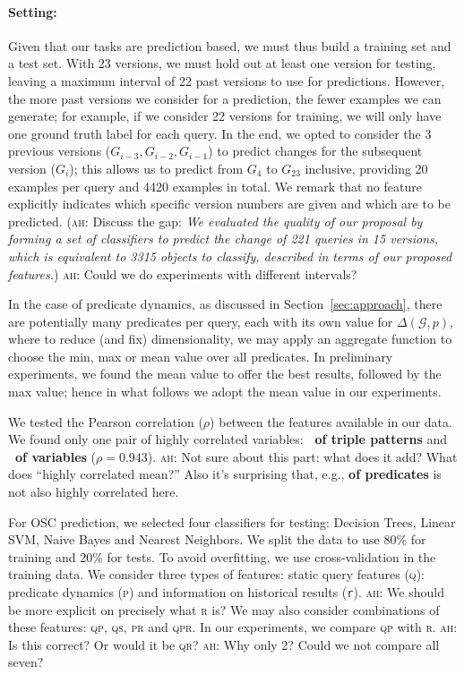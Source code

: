 \documentclass[runningheads]{llncs}
\newcommand{\ah}[1]{{\color{blue}\textsc{ah:} #1}}
\begin{document}
\paragraph{Setting:} Given that our tasks are prediction based, we must thus build a training set and a test set. With 23 versions, we must hold out at least one version for testing, leaving a maximum interval of 22 past versions to use for predictions. However, the more past versions we consider for a prediction, the fewer examples we can generate; for example, if we consider 22 versions for training, we will only have one ground truth label for each query. In the end, we opted to consider the 3 previous versions ($G_{i-3}, G_{i-2}, G_{i-1}$) to predict changes for the subsequent version ($G_i$); this allows us to predict from $G_4$ to $G_{23}$ inclusive, providing 20 examples per query and 4420 examples in total. We remark that no feature explicitly indicates which specific version numbers are given and which are to be predicted. (\ah{Discuss the gap: \textit{We evaluated the quality of our proposal by forming a set of classifiers to predict the change of 221 queries in 15 versions, which is equivalent to 3315 objects to classify, described in terms of our proposed features.}}) \ah{Could we do experiments with different intervals?}

In the case of predicate dynamics, as discussed in Section~\ref{sec:approach}, there are potentially many predicates per query, each with its own value for $\Delta(\mathcal{G},p)$, where to reduce (and fix) dimensionality, we may apply an aggregate function to choose the min, max or mean value over all predicates. In preliminary experiments, we found the mean value to offer the best results, followed by the max value; hence in what follows we adopt the mean value in our experiments.

We tested the Pearson correlation ($\rho$) between the features available in our data. We found only one pair of highly correlated variables: \textbf{\textnumero\ of triple patterns} and \textbf{\textnumero\ of variables} ($\rho = 0.943$). \ah{Not sure about this part: what does it add? What does ``highly correlated mean?'' Also it's surprising that, e.g., \textbf{\textnumero of predicates} is not also highly correlated here.}

For OSC prediction, we selected four classifiers for testing: Decision Trees, Linear SVM, Naive Bayes and Nearest Neighbors. We split the data to use 80\% for training and 20\% for tests. To avoid overfitting, we use cross-validation in the training data. We consider three types of features: static query features (\textsc{q}): predicate dynamics (\textsc{p}) and information on historical results (\texttt{r}). \ah{We should be more explicit on precisely what \textsc{r} is?} We may also consider combinations of these features: \textsc{qp}, \textsc{qs}, \textsc{pr} and \textsc{qpr}. In our experiments, we compare \textsc{qp} with \textsc{r}. \ah{Is this correct? Or would it be \textsc{qr}?} \ah{Why only 2? Could we not compare all seven?}
\end{document}

